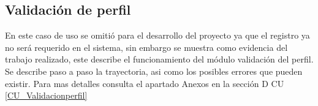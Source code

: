 		\subsection{Validación de perfil}
		\noindent En este caso de uso se omitió para el desarrollo del proyecto ya que el registro ya no será requerido en el sistema, sin embargo se muestra como evidencia del trabajo realizado, este describe el funcionamiento del módulo validación del perfil. Se describe paso a paso la trayectoria, asi como los posibles errores que pueden existir. Para mas detalles consulta el apartado Anexos en la sección D CU \ref{CU_Validacionperfil}
	
	
	
